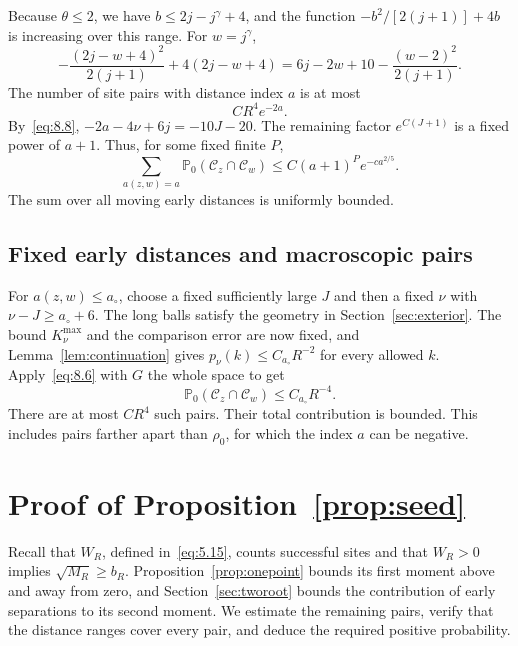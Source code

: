 \documentclass[11pt,a4paper]{article}
\numberwithin{equation}{section}
\theoremstyle{remark}
\begin{document}
Because $\theta\le2$, we have $b\le2j-j^\gamma+4$, and the function
$-b^2/[2(j+1)]+4b$ is increasing over this range. For $w=j^\gamma$,
\begin{equation}\label{eq:8.25}
-\frac{(2j-w+4)^2}{2(j+1)}+4(2j-w+4)
=6j-2w+10-\frac{(w-2)^2}{2(j+1)}.
\end{equation}
The number of site pairs with distance index $a$ is at most
\begin{equation}\label{eq:8.26}
CR^4e^{-2a}.
\end{equation}
By~\eqref{eq:8.8}, $-2a-4\nu+6j=-10J-20$. The remaining factor $e^{C(J+1)}$ is a fixed power of $a+1$. Thus, for some fixed finite $P$,
\begin{equation}\label{eq:8.27}
\sum_{a(z,w)=a}\mathbb P_0(\mathcal C_z\cap\mathcal C_w)
\le C(a+1)^P e^{-c a^{2/5}}.
\end{equation}
The sum over all moving early distances is uniformly bounded.

\subsection{Fixed early distances and macroscopic pairs}\label{sec:far}
For $a(z,w)\le a_\circ$, choose a fixed sufficiently large $J$ and then a fixed $\nu$ with $\nu-J\ge a_\circ+6$. The long balls satisfy the geometry in Section~\ref{sec:exterior}. The bound $K_\nu^{\max}$ and the comparison error are now fixed, and Lemma~\ref{lem:continuation} gives
$p_\nu(k)\le C_{a_\circ}R^{-2}$ for every allowed $k$. Apply~\eqref{eq:8.6} with $G$ the whole space to get
\begin{equation}\label{eq:8.28}
\mathbb P_0(\mathcal C_z\cap\mathcal C_w)
\le C_{a_\circ}R^{-4}.
\end{equation}
There are at most $CR^4$ such pairs. Their total contribution is bounded. This includes pairs farther apart than $\rho_0$, for which the index $a$ can be negative.


\section{Proof of Proposition~\ref{prop:seed}}\label{sec:second}
Recall that $W_R$, defined in~\eqref{eq:5.15}, counts successful sites and that $W_R>0$ implies $\sqrt{M_R}\ge b_R$. Proposition~\ref{prop:onepoint} bounds its first moment above and away from zero, and Section~\ref{sec:tworoot} bounds the contribution of early separations to its second moment. We estimate the remaining pairs, verify that the distance ranges cover every pair, and deduce the required positive probability.
\end{document}
